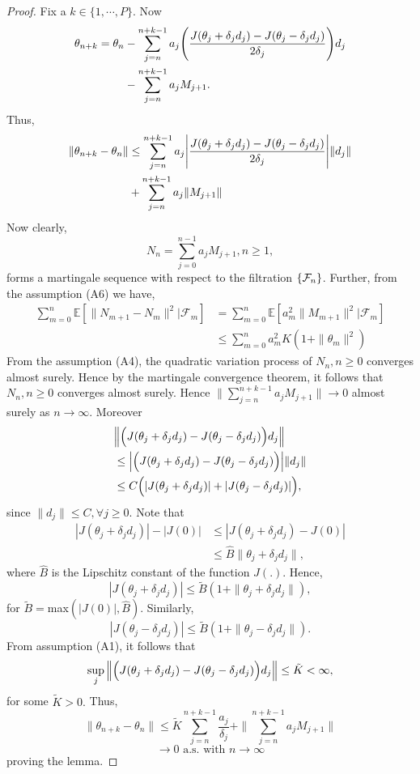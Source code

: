 \begin{proof}
 Fix a $k \in \{1,\cdots,P \}.$ Now
 \begin{align*}
 \begin{split}
 \theta_{n+k} = \theta_n & -\sum_{j=n}^{n+k-1}a_j\Bigg{(}\frac{J(\theta_j+\delta_j d_j)-J(\theta_j-\delta_j d_j)}{2\delta_j}\Bigg{)}d_j \\ 
  &-\sum_{j=n}^{n+k-1}a_jM_{j+1}.
 \end{split}
 \end{align*}
 Thus,
 \begin{align*}
 \begin{split}
 \|\theta_{n+k}-\theta_n\| &\leq \sum_{j=n}^{n+k-1}a_j\Bigg{|}\frac{J(\theta_j+\delta_{j} d_j)-J(\theta_j-\delta_{j} d_j)}{2\delta_j}\Bigg{|}\|d_j\|\\
 &+\sum_{j=n}^{n+k-1}a_j\|M_{j+1}\|
\end{split}
 \end{align*}
Now clearly,
$$N_n=\sum_{j=0}^{n-1}a_jM_{j+1}, n\geq1,$$
forms a martingale sequence with respect to the filtration $\{\mathcal{F}_n\}$.
Further, from the assumption (A6) we have,
\begin{align*}
\sum_{m=0}^{n}\mathbb{E}[\|N_{m+1}-N_{m}\|^2|\mathcal{F}_{m}]& =\sum_{m=0}^{n}\mathbb{E}[a_{m}^2\|M_{m+1}\|^2|\mathcal{F}_{m}]\\
& \leq \sum_{m=0}^{n}a_{m}^2K(1+\|\theta_m\|^2)
\end{align*}
From the assumption (A4), the quadratic variation process of $N_n,n\geq0$ converges 
almost surely. Hence by the martingale convergence theorem, it follows that 
$N_n, n\geq0$ converges almost surely. Hence
$\|\sum\limits_{j=n}^{n+k-1}a_jM_{j+1}\|\rightarrow 0$ almost surely as $n\rightarrow \infty.$
Moreover
\begin{align*}
&\Big{\|}\Big{(}J(\theta_j+\delta_j d_j)-J(\theta_j-\delta_j d_j)\Big{)}d_j\Big{\|} \\
& \leq \Big{|}\Big{(}J(\theta_j+\delta_j d_j)-J(\theta_j-\delta_j d_j)\Big{)}\Big{|}\|d_j\|\\
& \leq C \Big{(}|J(\theta_j+\delta_j d_j)|+|J(\theta_j-\delta_j d_j)|\Big{)},
\end{align*}
since $\|d_j\|\leq C, \forall j \geq0.$
Note that
\begin{align*}
|J(\theta_j+\delta_j d_j)|-|J(0)| & \leq|J(\theta_j+\delta_j d_j)-J(0)| \\
& \leq \hat{B} \|\theta_j+\delta_j d_j\|,
\end{align*}
where $\hat{B}$ is the Lipschitz constant of the function $J(.).$ Hence,
$$|J(\theta_j+\delta_j d_j)|\leq \tilde{B}(1+\|\theta_j+\delta_j d_j\|),$$
for $\tilde{B}=$max$(|J(0)|,\hat{B}).$ Similarly,
$$|J(\theta_j-\delta_j d_j)|\leq \tilde{B}(1+\|\theta_j-\delta_j d_j\|).$$
From assumption (A1), it follows that
$$\sup_j\Big{\|}\Big{(}J(\theta_j+\delta_j d_j)-J(\theta_j-\delta_j d_j)\Big{)}d_j\Big{\|}\leq \tilde{K}<\infty,$$
for some $\tilde{K}>0.$ Thus,
$$\|\theta_{n+k}-\theta_n\| \leq \tilde{K}\sum_{j=n}^{n+k-1}\frac{a_j}{\delta_j}+\|\sum_{j=n}^{n+k-1}a_jM_{j+1}\|$$
$$\rightarrow 0 \text{ a.s. with } n \rightarrow \infty$$
proving the lemma.
\end{proof}
